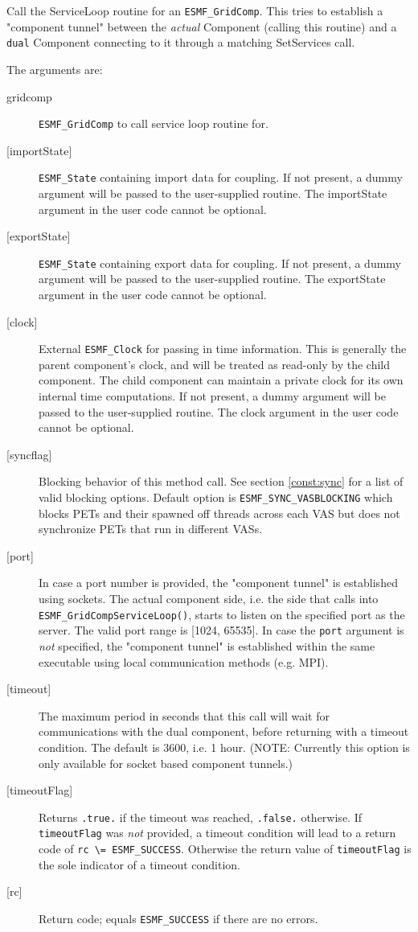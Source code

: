    Call the ServiceLoop routine for an {\tt ESMF\_GridComp}.
   This tries to establish a "component tunnel" between the {\em actual}
   Component (calling this routine) and a {\tt dual} Component connecting to it
   through a matching SetServices call.
  
   The arguments are:
   \begin{description}
   \item[gridcomp]
     {\tt ESMF\_GridComp} to call service loop routine for.
   \item[{[importState]}]
     {\tt ESMF\_State} containing import data for coupling. If not present, a dummy
     argument will be passed to the user-supplied routine.  The
     importState argument in the user code cannot be optional.
   \item[{[exportState]}]
     {\tt ESMF\_State} containing export data for coupling. If not present, a dummy
     argument will be passed to the user-supplied routine.  The
     exportState argument in the user code cannot be optional.
   \item[{[clock]}]
     External {\tt ESMF\_Clock} for passing in time information.
     This is generally the parent component's clock, and will be treated
     as read-only by the child component.  The child component can maintain
     a private clock for its own internal time computations. If not present, a dummy
     argument will be passed to the user-supplied routine.  The
     clock argument in the user code cannot be optional.
   \item[{[syncflag]}]
     Blocking behavior of this method call. See section \ref{const:sync}
     for a list of valid blocking options. Default option is
     {\tt ESMF\_SYNC\_VASBLOCKING} which blocks PETs and their spawned off threads
     across each VAS but does not synchronize PETs that run in different VASs.
   \item[{[port]}]
     In case a port number is provided, the "component tunnel" is established
     using sockets. The actual component side, i.e. the side that calls into
     {\tt ESMF\_GridCompServiceLoop()}, starts to listen on the specified port
     as the server. The valid port range is [1024, 65535].
     In case the {\tt port} argument is {\em not} specified, the "component
     tunnel" is established within the same executable using local communication
     methods (e.g. MPI).
   \item[{[timeout]}]
     The maximum period in seconds that this call will wait for communications
     with the dual component, before returning with a timeout condition.
     The default is 3600, i.e. 1 hour.
     (NOTE: Currently this option is only available for socket based component
     tunnels.)
   \item[{[timeoutFlag]}]
     Returns {\tt .true.} if the timeout was reached, {\tt .false.} otherwise.
     If {\tt timeoutFlag} was {\em not} provided, a timeout condition will lead
     to a return code of {\tt rc \textbackslash = ESMF\_SUCCESS}. Otherwise the
     return value of {\tt timeoutFlag} is the sole indicator of a timeout
     condition.
   \item[{[rc]}]
     Return code; equals {\tt ESMF\_SUCCESS} if there are no errors.
   \end{description}
